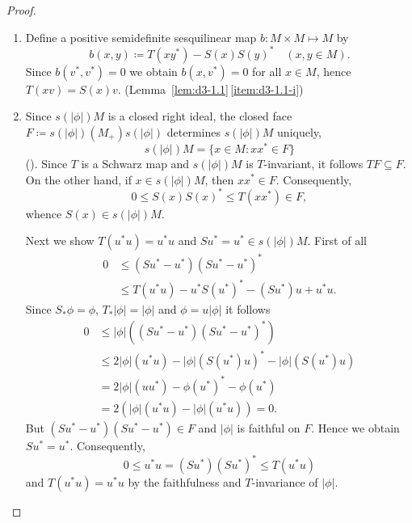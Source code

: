 \begin{proof}
\begin{enumerate}[\upshape (i), wide, labelindent=.5em]
\item 
Define a positive semidefinite sesquilinear map $b: M\times M \mapsto M$ by
\[
b(x,y) \coloneqq T(xy^{*}) - S(x)S(y)^{*} \quad (x, y\in M).
\]
Since $b(v^{*},v^{*}) = 0$ we obtain $b(x,v^{*}) = 0$ for all $x \in M$,  hence $T(xv) = S(x)v$. (Lemma~\ref{lem:d3-1.1}\,\ref{item:d3-1.1-i})

\item
Since $s(|\phi|)M$ is a closed right ideal, the closed face $F \coloneqq s(|\phi|)(M_{+})s(|\phi|)$ determines $s(|\phi|)M$ uniquely, \ie
\[
s(|\phi|)M = \{x \in M \colon xx^{*} \in F\}
\]
(\citet[Theorem 1.5.2]{pedersen:1979}). 
Since $T$ is a Schwarz map and $s(|\phi|)M$ is $T$-invariant, it follows $TF \subseteq F$.
On the other hand, if $x \in s(|\phi|)M$, then $xx^{*} \in F$.
Consequently,
\[
0 \leq S(x)S(x)^{*} \leq T(xx^{*}) \in F,
\]
whence $S(x) \in s(|\phi|)M$.

Next we show $T(u^{*}u) = u^{*}u$ and $Su^{*} = u^{*} \in s(|\phi|)M$.
First of all
\begin{align*}
	0 &\leq (Su^{*} - u^{*})(Su^{*} - u^{*})^{*} \\
	& \leq T(u^{*}u) - u^{*}S(u^{*})^{*} - (Su^{*})u + u^{*}u.
\end{align*}
Since $ S_{*}\phi = \phi $, $ T_{*}|\phi| = |\phi| $ and $ \phi = u|\phi| $ it follows
\begin{align*}
	0 &\leq |\phi|((Su^{*} - u^{*})(Su^{*} - u^{*})^{*}) \\
	& \leq 2|\phi|(u^{*}u) - |\phi|(S(u^{*})u)^{*} - |\phi|(S(u^{*})u) \\
	& = 2|\phi|(uu^{*}) - \phi(u^{*})^{*} - \phi(u^{*}) \\
	& = 2(|\phi|(u^{*}u) - |\phi|(u^{*}u)) = 0.
\end{align*}
But $(Su^{*} - u^{*})(Su^{*} - u^{*}) \in F$ and $|\phi|$ is faithful on $F$.
Hence we obtain $Su^{*} = u^{*}$.
Consequently,
\[
	0 \leq u^{*}u = (Su^{*})(Su^{*})^{*} \leq T(u^{*}u)
\]
and $T(u^{*}u) = u^{*}u$ by the faithfulness and $T$-invariance of $|\phi|$.
\end{enumerate}
\end{proof}
